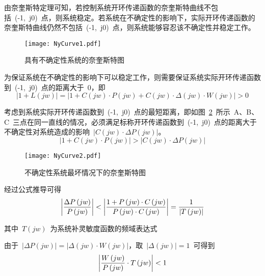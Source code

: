 由奈奎斯特定理可知，若控制系统开环传递函数的奈奎斯特曲线不包括~(-1,~j0)~点，则系统稳定。若系统在不确定性的影响下，实际开环传递函数的奈奎斯特曲线仍然不包括~(-1,~j0)~点，则系统能够容忍该不确定性并稳定工作。
\begin{figure}[h]
  \centering
     \texttt{[image: NyCurve1.pdf]}\\
   \caption{具有不确定性系统的奈奎斯特图}\label{fig:chap3:nycurve1}
\end{figure}

为保证系统在不确定性的影响下可以稳定工作，则需要保证系统实际开环传递函数到~(-1,~j0)~点的距离大于~0，即
\begin{equation}\label{equ:chap3:Index23}
\left\vert 1+L\left(jw\right)\right\vert=\left\vert1+C\left(jw\right)\cdot P\left(jw\right)+C\left(jw\right)\cdot\Delta\left(jw\right)\cdot W\left(jw\right)\right\vert>0
\end{equation}

考虑到系统实际开环传递函数到~(-1,~j0)~点的最短距离，即如图~\ref{fig:chap3:nycurve2}~所示~A、B、C~三点在同一直线的情况，必须满足标称开环传递函数到~(-1,~j0)~点的距离大于不确定性对系统造成的影响~$\left\vert C\left(jw\right)\cdot \Delta P\left(jw\right)\right\vert$。
\begin{equation}\label{equ:chap3:Index24}
\left\vert 1+ C\left(jw\right)\cdot P\left(jw\right)\right\vert>\left\vert C\left(jw\right)\cdot \Delta P\left(jw\right)\right\vert
\end{equation}

\begin{figure}[h]
  \centering
     \texttt{[image: NyCurve2.pdf]}\\
   \caption{不确定性系统最坏情况下的奈奎斯特图}\label{fig:chap3:nycurve2}
\end{figure}

经过公式推导可得
\begin{equation}\label{equ:chap3:Index25}
\left\vert\displaystyle\frac{\Delta P\left(jw\right)}{P\left(jw\right)}\right\vert<\left\vert\displaystyle\frac{1+P\left(jw\right)\cdot C\left(jw\right)}{P\left(jw\right)\cdot C\left(jw\right)}\right\vert=\displaystyle\frac{1}{\left\vert T\left(jw\right)\right\vert}
\end{equation}

其中~$T\left(jw\right)$~为系统补灵敏度函数的频域表达式


由于~$\left\vert\Delta P\left(jw\right)\right\vert=\left\vert\Delta\left(jw\right)\cdot W\left(jw\right)\right\vert$，取~$\left\vert\Delta \left(jw\right)\right\vert=1$~可得到
\begin{equation}\label{equ:chap3:Index26}
\left\vert\displaystyle\frac{W\left(jw\right)}{P\left(jw\right)}\cdot T\left(jw\right)\right\vert<1
\end{equation}

